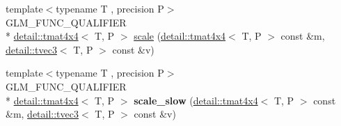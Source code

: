 \begin{DoxyCompactItemize}
\item 
{\footnotesize template$<$typename T , precision P$>$ }\\G\-L\-M\-\_\-\-F\-U\-N\-C\-\_\-\-Q\-U\-A\-L\-I\-F\-I\-E\-R \\*
\hyperlink{structglm_1_1detail_1_1tmat4x4}{detail\-::tmat4x4}$<$ T, P $>$ \hyperlink{group__gtc__matrix__transform_gabd40959f269abd16c256a4f59ab03d62}{scale} (\hyperlink{structglm_1_1detail_1_1tmat4x4}{detail\-::tmat4x4}$<$ T, P $>$ const \&m, \hyperlink{structglm_1_1detail_1_1tvec3}{detail\-::tvec3}$<$ T, P $>$ const \&v)
\item 
\hypertarget{namespaceglm_aa836cb5d035a8b96e5e9b4bb5dce0ab2}{{\footnotesize template$<$typename T , precision P$>$ }\\G\-L\-M\-\_\-\-F\-U\-N\-C\-\_\-\-Q\-U\-A\-L\-I\-F\-I\-E\-R \\*
\hyperlink{structglm_1_1detail_1_1tmat4x4}{detail\-::tmat4x4}$<$ T, P $>$ {\bfseries scale\-\_\-slow} (\hyperlink{structglm_1_1detail_1_1tmat4x4}{detail\-::tmat4x4}$<$ T, P $>$ const \&m, \hyperlink{structglm_1_1detail_1_1tvec3}{detail\-::tvec3}$<$ T, P $>$ const \&v)}\label{namespaceglm_aa836cb5d035a8b96e5e9b4bb5dce0ab2}


\end{DoxyCompactItemize}
